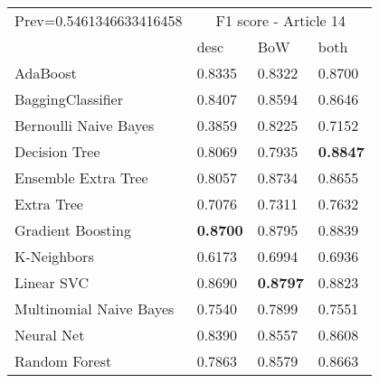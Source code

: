 \begin{tabular}{|l|l|l|l| }
\hline
Prev=0.5461346633416458 &  \multicolumn{3}{c|}{F1 score - Article 14} \\
\cline{2-4} & desc & BoW & both \\ \hline
AdaBoost                & 0.8335 & 0.8322 & 0.8700\\
BaggingClassifier       & 0.8407 & 0.8594 & 0.8646\\
Bernoulli Naive Bayes   & 0.3859 & 0.8225 & 0.7152\\
Decision Tree           & 0.8069 & 0.7935 & {\bf 0.8847}\\
Ensemble Extra Tree     & 0.8057 & 0.8734 & 0.8655\\
Extra Tree              & 0.7076 & 0.7311 & 0.7632\\
Gradient Boosting       & {\bf 0.8700} & 0.8795 & 0.8839\\
K-Neighbors             & 0.6173 & 0.6994 & 0.6936\\
Linear SVC              & 0.8690 & {\bf 0.8797} & 0.8823\\
Multinomial Naive Bayes & 0.7540 & 0.7899 & 0.7551\\
Neural Net              & 0.8390 & 0.8557 & 0.8608\\
Random Forest           & 0.7863 & 0.8579 & 0.8663\\
\hline
\end{tabular}